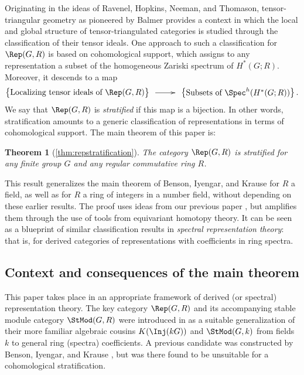 \documentclass{amsart}%
\numberwithin{equation}{section}%
\newtheorem{thmx}{Theorem}
\theoremstyle{remark}
\begin{document}
Originating in the ideas of Ravenel, Hopkins, Neeman, and Thomason, tensor-triangular geometry as pioneered by Balmer provides a context in which the local and global structure of tensor-triangulated categories is studied through the classification of their tensor ideals. One approach to such a classification for $\Rep(G,R)$ is based on cohomological support, which assigns to any representation a subset of the homogeneous Zariski spectrum of $H^*(G;R)$. Moreover, it descends to a map 
\[
\begin{Bmatrix}
\text{Localizing tensor ideals of } \Rep(G,R)
\end{Bmatrix} 
\xymatrix@C=2pc{ \ar[r]^-{} &}
\begin{Bmatrix}
\text{Subsets of } \Spec^h(H^*(G;R))
\end{Bmatrix}.
\]
We say that $\Rep(G,R)$ is \emph{stratified} if this map is a bijection. In other words, stratification amounts to a generic classification of representations in terms of cohomological support. The main theorem of this paper is:  

\begin{thmx}[\cref{thm:repstratification}]\label{thma}
The category $\Rep(G,R)$ is stratified for any finite group $G$ and any regular commutative ring $R$.
\end{thmx}

This result generalizes the main theorem of Benson, Iyengar, and Krause \cite{BensonIyengarKrause11a} for $R$ a field, as well as \cite{barthel_integral1} for $R$ a ring of integers in a number field, without depending on these earlier results. The proof uses ideas from our previous paper \cite{barthel_integral1}, but amplifies them through the use of tools from equivariant homotopy theory. It can be seen as a blueprint of similar classification results in \emph{spectral representation theory}: that is, for derived categories of representations with coefficients in ring spectra. 


\subsection{Context and consequences of the main theorem}

This paper takes place in an appropriate framework of derived (or spectral) representation theory. The key category $\Rep(G,R)$ and its accompanying stable module category $\StMod(G,R)$ were introduced in \cite{barthel_integral1} as a suitable generalization of their more familiar algebraic cousins $K(\Inj(kG))$ and $\StMod(G,k)$ from fields $k$ to general ring (spectra) coefficients. A previous candidate was constructed by Benson, Iyengar, and Krause \cite{BensonIyengarKrause13}, but was there found to be unsuitable for a cohomological stratification. 
\end{document}

